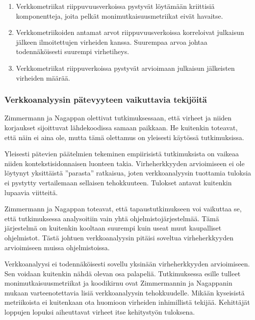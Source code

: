 \documentclass[finnish]{../tktltiki2}
\theoremstyle{definition}
\theoremstyle{remark}
\begin{document}
\begin{enumerate}

    \item Verkkometriikat riippuvuusverkoissa pystyvät löytämään kriittisiä komponentteja, joita pelkät 
          monimutkaisuusmetriikat eivät havaitse.
          
    \item Verkkometriikoiden antamat arvot riippuvuusverkoissa korreloivat julkaisun jälkeen ilmoitettujen virheiden 
          kanssa. Suurempaa arvoa johtaa todennäköisesti suurempi virhetiheys.
          
    \item Verkkometriikat riippuverkoissa pystyvät arvioimaan julkaisun jälkeisten virheiden määrää.

\end{enumerate}

\subsubsection{Verkkoanalyysin pätevyyteen vaikuttavia tekijöitä}

Zimmermann ja Nagappan olettivat tutkimuksessaan, että virheet ja niiden korjaukset sijoittuvat lähdekoodissa samaan 
paikkaan. He kuitenkin toteavat, että näin ei aina ole, mutta tämä olettamus on yleisesti käytössä tutkimuksissa.

    Yleisesti pätevien päätelmien tekeminen empiirisistä tutkimuksista on vaikeaa niiden kontekstisidonnaisen luonteen 
takia. Virheherkkyyden arvioimiseen ei ole löytynyt yksittäistä ''parasta'' ratkaisua, joten verkkoanalyysin tuottamia 
tuloksia ei pystytty vertailemaan sellaisen tehokkuuteen. Tulokset antavat kuitenkin lupaavia viitteitä.

    Zimmermann ja Nagappan toteavat, että tapaustutkimukseen voi vaikuttaa se, että tutkimuksessa analysoitiin vain yhtä 
ohjelmistojärjestelmää. Tämä järjestelmä on kuitenkin kooltaan suurempi kuin useat muut kaupalliset ohjelmistot. Tästä 
johtuen verkkoanalyysin pitäisi soveltua virheherkkyyden arvioimiseen muissa ohjelmistoissa. 

    Verkkoanalyysi ei todennäköisesti sovellu yksinään virheherkkyyden arvioimiseen. Sen voidaan kuitenkin nähdä olevan 
osa palapeliä. Tutkimuksessa esille tulleet monimutkaisuusmetriikat ja koodikirnu ovat Zimmermannin ja Nagappanin mukaan 
varteenotettavia lisiä verkkoanalyysin tehokkuudelle. Mikään kyseisistä metriikoista ei kuitenkaan ota huomioon 
virheiden inhimillistä tekijää. Kehittäjät loppujen lopuksi aiheuttavat virheet itse kehitystyön tuloksena.
\end{document}
